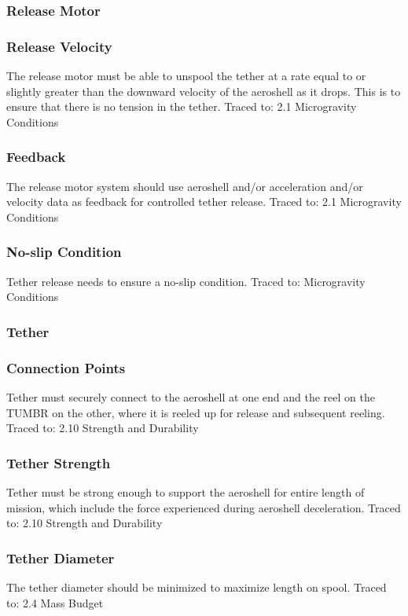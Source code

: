 \subsubsection{Release Motor}

\subsubsection*{Release Velocity}
\indent\indent The release motor must be able to unspool the tether at a rate equal to or slightly greater than the downward velocity of the aeroshell as it drops. This is to ensure that there is no tension in the tether. Traced to: 2.1 Microgravity Conditions

\subsubsection*{Feedback}
\indent\indent The release motor system should use aeroshell and/or acceleration and/or velocity data as feedback for controlled tether release. Traced to: 2.1 Microgravity Conditions

\subsubsection*{No-slip Condition}
\indent\indent Tether release needs to ensure a no-slip condition. Traced to: Microgravity Conditions

\subsubsection{Tether}

\subsubsection*{Connection Points}
\indent\indent Tether must securely connect to the aeroshell at one end and the reel on the TUMBR on the other, where it is reeled up for release and subsequent reeling. Traced to: 2.10 Strength and Durability

\subsubsection*{Tether Strength}
\indent\indent Tether must be strong enough to support the aeroshell for entire length of mission, which include the force experienced during aeroshell deceleration. Traced to: 2.10 Strength and Durability

\subsubsection*{Tether Diameter}
\indent\indent The tether diameter should be minimized to maximize length on spool. Traced to: 2.4 Mass Budget

